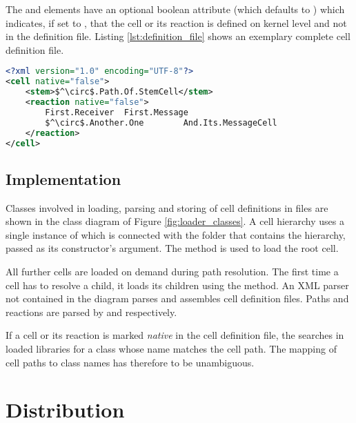 The  and  elements have an optional boolean attribute  (which defaults to ) which indicates, if set to , that the cell or its reaction is defined on kernel level and not in the definition file. Listing \ref{lst:definition_file} shows an exemplary complete cell definition file.

\begin{lstlisting}[mathescape, float=htbp, label=lst:definition_file, 
caption=Cell definition file, language=XML]
<?xml version="1.0" encoding="UTF-8"?>
<cell native="false">
	<stem>$^\circ$.Path.Of.StemCell</stem>
	<reaction native="false">
		First.Receiver	First.Message
		$^\circ$.Another.One		And.Its.MessageCell
 	</reaction>
</cell>
\end{lstlisting}

\subsection{Implementation}

Classes involved in loading, parsing and storing of cell definitions in files are shown in the class diagram of Figure \ref{fig:loader_classes}. A cell hierarchy uses a single instance of  which is connected with the folder that contains the hierarchy, passed as its constructor's argument. The  method is used to load the root cell. 

All further cells are loaded on demand during path resolution. The first time a cell has to resolve a child, it loads its children using the  method. An XML parser not contained in the diagram parses and assembles cell definition files. Paths and reactions are parsed by  and  respectively.

If a cell or its reaction is marked \textit{native} in the cell definition file, the  searches in loaded libraries for a class whose name matches the cell path. The mapping of cell paths to class names has therefore to be unambiguous.


\section{Distribution}
\label{sec:distribution}

